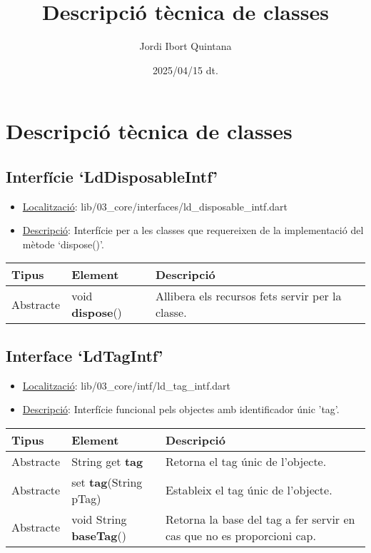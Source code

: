 \documentclass{article}
\title{Descripció tècnica de classes}
\author{Jordi Ibort Quintana}
\date{2025/04/15 dt.}
\begin{document}
\maketitle

\section{Descripció tècnica de classes}

\subsection{Interfície `LdDisposableIntf'}
\begin{itemize}
    \item \underline{Localització}: lib/03\_core/interfaces/ld\_disposable\_intf.dart
    \item \underline{Descripció}: Interfície per a les classes que requereixen de la implementació del mètode `dispose()'.
\end{itemize}

\begin{longtable}{@{}L{1.25cm}L{4.5cm}L{9.5cm}@{}}
\toprule
\textbf{Tipus} & \textbf{Element} & \textbf{Descripció} \\
\midrule
Abstracte & void \textbf{dispose}() & Allibera els recursos fets servir per la classe.\\
\bottomrule
\end{longtable}

\subsection{Interface `LdTagIntf'}
\begin{itemize}
    \item \underline{Localització}: lib/03\_core/intf/ld\_tag\_intf.dart
    \item \underline{Descripció}: Interfície funcional pels objectes amb identificador únic 'tag'.
\end{itemize}

\begin{longtable}{@{}L{1.25cm}L{4.5cm}L{8.75cm}@{}}
\toprule
\textbf{Tipus} & \textbf{Element} & \textbf{Descripció} \\
\midrule
Abstracte & String get \textbf{tag} & Retorna el tag únic de l'objecte. \\
Abstracte & set \textbf{tag}(String pTag)  & Estableix el tag únic de l'objecte.  \\
Abstracte  & void String \textbf{baseTag}() & Retorna la base del tag a fer servir en cas que no es proporcioni cap. \\
\bottomrule
\end{longtable}
\end{document}
